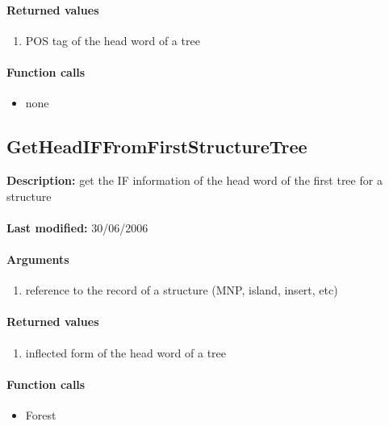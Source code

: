 \paragraph{Returned values}
\begin{enumerate}
\item POS tag of the head word of a tree
\end{enumerate}

\paragraph{Function calls}
\begin{itemize}
\item none
\end{itemize}

\subsection{GetHeadIFFromFirstStructureTree}
\textbf{Description:} get the IF information of the head word of the first tree for a structure\\
\\\textbf{Last modified:} 30/06/2006

\paragraph{Arguments}
\begin{enumerate}
\item reference to the record of a structure (MNP, island, insert, etc)
\end{enumerate}

\paragraph{Returned values}
\begin{enumerate}
\item inflected form of the head word of a tree
\end{enumerate}

\paragraph{Function calls}
\begin{itemize}
\item Forest
\end{itemize}

